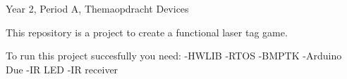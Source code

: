 Year 2, Period A, Themaopdracht Devices

This repository is a project to create a functional laser tag game.

To run this project succesfully you need\+: -\/H\+W\+L\+IB -\/R\+T\+OS -\/B\+M\+P\+TK -\/Arduino Due -\/IR L\+ED -\/IR receiver 